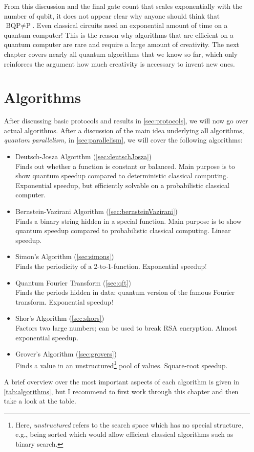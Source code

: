 		From this discussion and the final gate count that scales exponentially with the number of qubit, it does not appear clear why anyone should think that \( \text{BQP} \neq \text{P} \). Even classical circuits need an exponential amount of time on a quantum computer! This is the reason why algorithms that are efficient on a quantum computer are rare and require a large amount of creativity. The next chapter covers nearly all quantum algorithms that we know so far, which only reinforces the argument how much creativity is necessary to invent new ones.

\chapter{Algorithms}
	\label{c:algorithms}

	After discussing basic protocols and results in \autoref{sec:protocols}, we will now go over actual algorithms. After a discussion of the main idea underlying all algorithms, \emph{quantum parallelism,} in \autoref{sec:parallelism}, we will cover the following algorithms:
	\begin{itemize}
		\item Deutsch-Josza Algorithm (\autoref{sec:deutschJosza}) \\
			Finds out whether a function is constant or balanced. Main purpose is to show quantum speedup compared to deterministic classical computing. Exponential speedup, but efficiently solvable on a probabilistic classical computer.
		\item Bernstein-Vazirani Algorithm (\autoref{sec:bernsteinVazirani}) \\
			Finds a binary string hidden in a special function. Main purpose is to show quantum speedup compared to probabilistic classical computing. Linear speedup.
		\item Simon's Algorithm (\autoref{sec:simons}) \\
			Finds the periodicity of a 2-to-1-function. Exponential speedup!
		\item Quantum Fourier Transform (\autoref{sec:qft}) \\
			Finds the periods hidden in data; quantum version of the famous Fourier transform. Exponential speedup!
		\item Shor's Algorithm (\autoref{sec:shors}) \\
			Factors two large numbers; can be used to break RSA encryption. Almost exponential speedup.
		\item Grover's Algorithm (\autoref{sec:grovers}) \\
			Finds a value in an unstructured\footnote{Here, \emph{unstructured} refers to the search space which has no special structure, e.g., being sorted which would allow efficient classical algorithms such as binary search.} pool of values. Square-root speedup.
	\end{itemize}
	A brief overview over the most important aspects of each algorithm is given in \autoref{tab:algorithms}, but I recommend to first work through this chapter and then take a look at the table.

